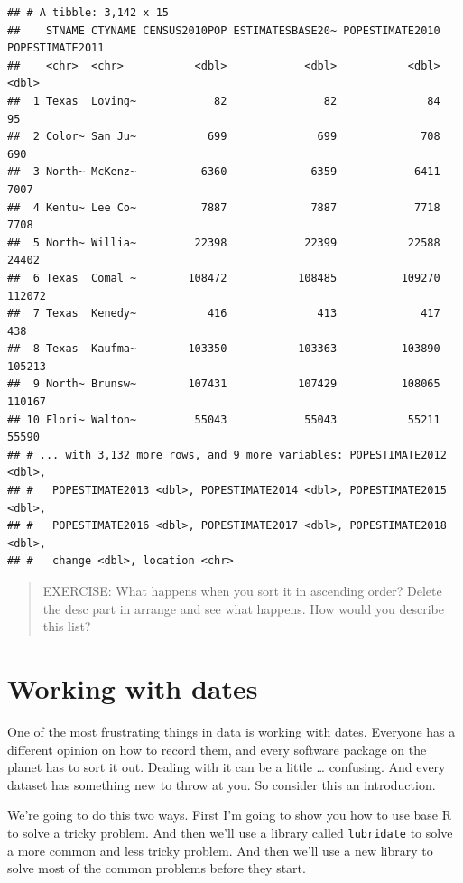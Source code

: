 \documentclass[]{book}
\begin{document}
\begin{verbatim}
## # A tibble: 3,142 x 15
##    STNAME CTYNAME CENSUS2010POP ESTIMATESBASE20~ POPESTIMATE2010 POPESTIMATE2011
##    <chr>  <chr>           <dbl>            <dbl>           <dbl>           <dbl>
##  1 Texas  Loving~            82               82              84              95
##  2 Color~ San Ju~           699              699             708             690
##  3 North~ McKenz~          6360             6359            6411            7007
##  4 Kentu~ Lee Co~          7887             7887            7718            7708
##  5 North~ Willia~         22398            22399           22588           24402
##  6 Texas  Comal ~        108472           108485          109270          112072
##  7 Texas  Kenedy~           416              413             417             438
##  8 Texas  Kaufma~        103350           103363          103890          105213
##  9 North~ Brunsw~        107431           107429          108065          110167
## 10 Flori~ Walton~         55043            55043           55211           55590
## # ... with 3,132 more rows, and 9 more variables: POPESTIMATE2012 <dbl>,
## #   POPESTIMATE2013 <dbl>, POPESTIMATE2014 <dbl>, POPESTIMATE2015 <dbl>,
## #   POPESTIMATE2016 <dbl>, POPESTIMATE2017 <dbl>, POPESTIMATE2018 <dbl>,
## #   change <dbl>, location <chr>
\end{verbatim}

\begin{quote}
EXERCISE: What happens when you sort it in ascending order? Delete the desc part in arrange and see what happens. How would you describe this list?
\end{quote}

\hypertarget{working-with-dates}{%
\chapter{Working with dates}\label{working-with-dates}}

One of the most frustrating things in data is working with dates. Everyone has a different opinion on how to record them, and every software package on the planet has to sort it out. Dealing with it can be a little \ldots{} confusing. And every dataset has something new to throw at you. So consider this an introduction.

We're going to do this two ways. First I'm going to show you how to use base R to solve a tricky problem. And then we'll use a library called \texttt{lubridate} to solve a more common and less tricky problem. And then we'll use a new library to solve most of the common problems before they start.
\end{document}
